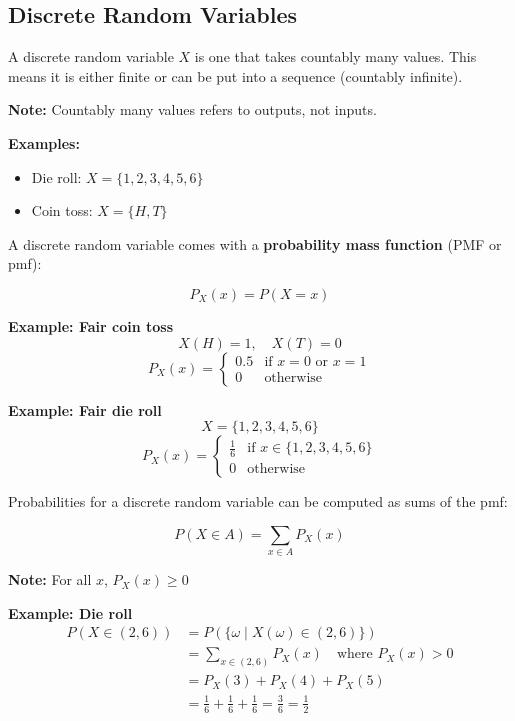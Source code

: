 \documentclass{article}
\begin{document}
    \pagebreak

    
    \subsection*{Discrete Random Variables}

    A discrete random variable $X$ is one that takes countably many values. This means it is either finite or can be put into a sequence (countably infinite).

    \textbf{Note:} Countably many values refers to outputs, not inputs.

    \textbf{Examples:}
    \begin{itemize}
        \item Die roll: $X = \{1, 2, 3, 4, 5, 6\}$
        \item Coin toss: $X = \{H, T\}$
    \end{itemize}

    A discrete random variable comes with a \textbf{probability mass function} (PMF or pmf):

    \[
    P_X(x) = P(X = x)
    \]

    \textbf{Example: Fair coin toss}
    \[
    X(H) = 1, \quad X(T) = 0
    \]
    \[
    P_X(x) = 
    \begin{cases} 
        0.5 & \text{if } x = 0 \text{ or } x = 1 \\
        0   & \text{otherwise}
    \end{cases}
    \]

    \textbf{Example: Fair die roll}
    \[
    X = \{1, 2, 3, 4, 5, 6\}
    \]
    \[
    P_X(x) = 
    \begin{cases} 
        \frac{1}{6} & \text{if } x \in \{1, 2, 3, 4, 5, 6\} \\
        0           & \text{otherwise}
    \end{cases}
    \]

    Probabilities for a discrete random variable can be computed as sums of the pmf:

    \[
    P(X \in A) = \sum_{x \in A} P_X(x)
    \]

    \textbf{Note:} For all $x$, $P_X(x) \geq 0$

    \textbf{Example: Die roll}
    \begin{align*}
    P(X \in (2, 6)) &= P(\{\omega \mid X(\omega) \in (2, 6)\}) \\
                    &= \sum_{x \in (2, 6)} P_X(x) \quad \text{where } P_X(x) > 0 \\
                    &= P_X(3) + P_X(4) + P_X(5)\\
                    &= \frac{1}{6} + \frac{1}{6} + \frac{1}{6} =  \frac{3}{6} = \frac{1}{2}
    \end{align*}
\end{document}
